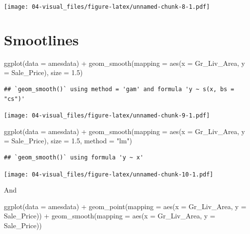 \documentclass[
]{book}
\newenvironment{Shaded}{\begin{snugshade}}{\end{snugshade}}
\newcommand{\AttributeTok}[1]{\textcolor[rgb]{0.77,0.63,0.00}{#1}}
\newcommand{\FloatTok}[1]{\textcolor[rgb]{0.00,0.00,0.81}{#1}}
\newcommand{\FunctionTok}[1]{\textcolor[rgb]{0.00,0.00,0.00}{#1}}
\newcommand{\NormalTok}[1]{#1}
\newcommand{\SpecialCharTok}[1]{\textcolor[rgb]{0.00,0.00,0.00}{#1}}
\newcommand{\StringTok}[1]{\textcolor[rgb]{0.31,0.60,0.02}{#1}}
\theoremstyle{definition}
\theoremstyle{definition}
\theoremstyle{definition}
\theoremstyle{definition}
\theoremstyle{remark}
\begin{document}
\texttt{[image: 04-visual\_files/figure-latex/unnamed-chunk-8-1.pdf]}

\hypertarget{smootlines}{%
\section{Smootlines}\label{smootlines}}

\begin{Shaded}
\begin{Highlighting}[]
\FunctionTok{ggplot}\NormalTok{(}\AttributeTok{data =}\NormalTok{ amesdata) }\SpecialCharTok{+} 
  \FunctionTok{geom\_smooth}\NormalTok{(}\AttributeTok{mapping =} \FunctionTok{aes}\NormalTok{(}\AttributeTok{x =}\NormalTok{ Gr\_Liv\_Area, }
                           \AttributeTok{y =}\NormalTok{ Sale\_Price), }
              \AttributeTok{size =} \FloatTok{1.5}\NormalTok{)}
\end{Highlighting}
\end{Shaded}

\begin{verbatim}
## `geom_smooth()` using method = 'gam' and formula 'y ~ s(x, bs = "cs")'
\end{verbatim}

\texttt{[image: 04-visual\_files/figure-latex/unnamed-chunk-9-1.pdf]}

\begin{Shaded}
\begin{Highlighting}[]
\FunctionTok{ggplot}\NormalTok{(}\AttributeTok{data =}\NormalTok{ amesdata) }\SpecialCharTok{+} 
  \FunctionTok{geom\_smooth}\NormalTok{(}\AttributeTok{mapping =} \FunctionTok{aes}\NormalTok{(}\AttributeTok{x =}\NormalTok{ Gr\_Liv\_Area, }
                           \AttributeTok{y =}\NormalTok{ Sale\_Price), }
              \AttributeTok{size =} \FloatTok{1.5}\NormalTok{,}
              \AttributeTok{method =} \StringTok{"lm"}\NormalTok{)}
\end{Highlighting}
\end{Shaded}

\begin{verbatim}
## `geom_smooth()` using formula 'y ~ x'
\end{verbatim}

\texttt{[image: 04-visual\_files/figure-latex/unnamed-chunk-10-1.pdf]}

And

\begin{Shaded}
\begin{Highlighting}[]
\FunctionTok{ggplot}\NormalTok{(}\AttributeTok{data =}\NormalTok{ amesdata) }\SpecialCharTok{+} 
  \FunctionTok{geom\_point}\NormalTok{(}\AttributeTok{mapping =} \FunctionTok{aes}\NormalTok{(}\AttributeTok{x =}\NormalTok{ Gr\_Liv\_Area, }
                           \AttributeTok{y =}\NormalTok{ Sale\_Price)) }\SpecialCharTok{+}
  \FunctionTok{geom\_smooth}\NormalTok{(}\AttributeTok{mapping =} \FunctionTok{aes}\NormalTok{(}\AttributeTok{x =}\NormalTok{ Gr\_Liv\_Area, }
                           \AttributeTok{y =}\NormalTok{ Sale\_Price)) }
\end{Highlighting}
\end{Shaded}
\end{document}
